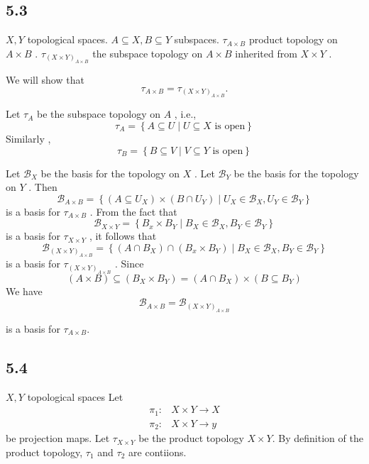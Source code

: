 \documentclass{article}
\theoremstyle{remark}
\newcommand{\newpara}
    {
    \vskip 0.4cm
    }
\begin{document}
\subsection*{5.3 }%
\label{sub:5_5}

$X,Y$ topological spaces. $A \subseteq  X, B \subseteq Y$  subspaces. $\tau _{A \times B}$  product topology on $A
\times B$ . $\tau _{\left( X \times Y \right)_{A \times  B}}$  the subspace topology on $A \times  B$  inherited from $X
\times  Y$ .
\newpara
We will show that \[
\tau _{A \times  B} = \tau _{\left( X \times Y \right)_{A \times B}}.
\]

Let $\tau _{A}$ be the subspace topology on $A$ , i.e., \[
\tau _{A} = \left\{ A \subseteq  U  \mid  U \subseteq  X \text{ is open} \right\}
\]
Similarly , \[
\tau _{B} = \left\{ B \subseteq  V  \mid  V \subseteq Y \text{ is open} \right\}
\]

Let $\mathscr{B} _{X}$ be the basis for the topology on $X$ . Let $\mathscr{B} _{Y}$ be the basis for the topology on
$Y$ .  Then \[
\mathscr{B}_{A \times B} = \left\{ \left( A \subseteq U _{X} \right) \times \left( B \cap U_{Y} \right)  \mid  U_{X} \in
\mathscr{B} _{X}, U_{Y} \in  \mathscr{B}  _{Y}\right\}
\] is a basis for $\tau _{A \times  B}$ . From the fact that \[
\mathscr{B}  _{X \times Y} = \left\{ B_{x} \times  B_{Y}  \mid  B_{X} \in  \mathscr{B} _{X}, B_{Y} \in \mathscr{B} _{Y} \right\}
\]
is a basis for $\tau _{X \times Y}$ , it follows that \[
\mathscr{B} _{\left( X \times Y \right)_{A \times B}} = \left\{ \left( A \cap B_{X} \right) \cap \left( B_{x} \times
B_{Y} \right)  \mid  B_{X} \in \mathscr{B} _{X} , B_{Y} \in \mathscr{B} _{Y} \right\}
\]
is a basis for $\tau _{\left( X \times Y \right)_{A \times B}}$ . Since \[
\left( A \times B \right) \subseteq \left( B_{X} \times  B_{Y} \right) = \left( A \cap B_{X}  \right) \times  \left( B
\subseteq B_{Y} \right)
\]
We have \[
    \mathscr{B} _{A\times B} = \mathscr{B} _{\left( X \times Y \right)_{A \times B}}
\]

is a basis for $\tau _{A  \times B}$.

\subsection*{5.4}%
\label{sub:5_6}

$X,Y$  topological spaces  Let \[
    \begin{split}
\pi _{1}:&  X \times Y \to X \\
\pi _{2} : &  X \times Y \to y
    \end{split}
\]
be projection maps. Let $\tau _{X \times Y}$ be the product topology $X \times Y$. By definition of the product
topology, $\tau _{1}$  and $\tau _{2}$  are contiions.
\end{document}
